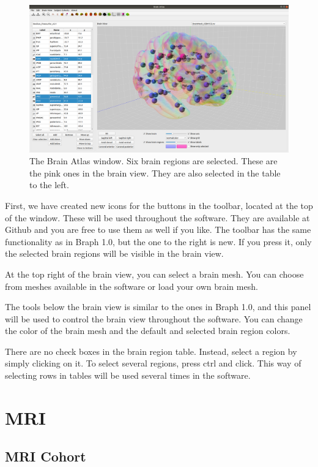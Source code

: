 \documentclass{article}
\begin{document}
\begin{figure}[H]
    \centering
    \includegraphics[width=0.9\linewidth]{brain_atlas.png}
    \caption{The Brain Atlas window. Six brain regions are selected. These are the pink ones in the brain view. They are also selected in the table to the left.}
    \label{fig:brain_atlas}
\end{figure}

First, we have created new icons for the buttons in the toolbar, located at the top of the window. These will be used throughout the software. They are available at Github and you are free to use them as well if you like. The toolbar has the same functionality as in Braph 1.0, but the one to the right is new. If you press it, only the selected brain regions will be visible in the brain view.

At the top right of the brain view, you can select a brain mesh. You can choose from meshes available in the software or load your own brain mesh.

The tools below the brain view is similar to the ones in Braph 1.0, and this panel will be used to control the brain view throughout the software. You can change the color of the brain mesh and the default and selected brain region colors.

There are no check boxes in the brain region table. Instead, select a region by simply clicking on it. To select several regions, press ctrl and click. This way of selecting rows in tables will be used several times in the software.

\section{MRI}

\subsection{MRI Cohort}
\end{document}
